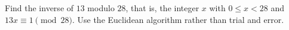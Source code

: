 Find the inverse of $13$ modulo $28$, that is, the integer $x$ with $0\le x<28$ and $13x\equiv1\pmod{28}$. Use the Euclidean algorithm rather than trial and error.
